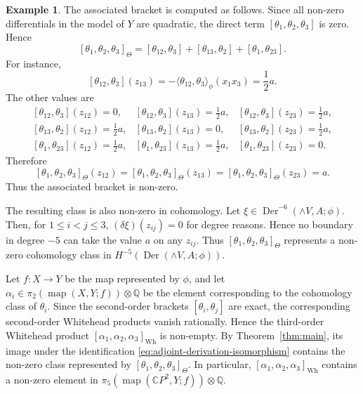 \documentclass[a4paper,10pt]{amsart}
\theoremstyle{definition}
\newtheorem{ex}[thm]{Example}
\theoremstyle{remark}
\newcommand{\map}{\operatorname{map}}
\newcommand{\Der}{\operatorname{Der}}
\numberwithin{equation}{section}
\begin{document}
\begin{ex}
The associated bracket is computed as follows. Since all non-zero differentials
in the model of $Y$ are quadratic, the direct term
$
[\theta_1,\theta_2,\theta_3]
$
is zero. Hence
\[
        [\theta_1,\theta_2,\theta_3]_\Theta
        =
        [\theta_{12},\theta_3]
        +
        [\theta_{13},\theta_2]
        +
        [\theta_1,\theta_{23}].
\]
For instance,
\[
[\theta_{12},\theta_3](z_{13})
=
-\langle\theta_{12},\theta_3\rangle_\phi(x_1x_3)
=
\frac{1}{2}a.
\]
The other values are
\[
\begin{array}{lll}
        [\theta_{12},\theta_3](z_{12})=0,&
        [\theta_{12},\theta_3](z_{13})=\frac{1}{2}a,&
        [\theta_{12},\theta_3](z_{23})=\frac{1}{2}a,\\[2mm]
        [\theta_{13},\theta_2](z_{12})=\frac{1}{2}a,&
        [\theta_{13},\theta_2](z_{13})=0,&
        [\theta_{13},\theta_2](z_{23})=\frac{1}{2}a,\\[2mm]
        [\theta_1,\theta_{23}](z_{12})=\frac{1}{2}a,&
        [\theta_1,\theta_{23}](z_{13})=\frac{1}{2}a,&
        [\theta_1,\theta_{23}](z_{23})=0.
\end{array}
\]
Therefore
\[
        [\theta_1,\theta_2,\theta_3]_\Theta(z_{12})
        =
        [\theta_1,\theta_2,\theta_3]_\Theta(z_{13})
        =
        [\theta_1,\theta_2,\theta_3]_\Theta(z_{23})
        =
        a.
\]
Thus the associated bracket is non-zero.

The resulting class is also non-zero in cohomology. Let
$
\xi\in \Der^{-6}(\wedge V,A;\phi).
$
Then, for $1\leq i<j\leq 3$, $(\delta\xi)(z_{ij}) = 0$ for degree reasons.
Hence no boundary in degree $-5$ can take the value $a$ on any $z_{ij}$. Thus
$
[\theta_1,\theta_2,\theta_3]_\Theta
$
represents a non-zero cohomology class in
$
H^{-5}(\Der(\wedge V,A;\phi)).
$

Let $f:X\to Y$ be the map represented by $\phi$, and let
$\alpha_i\in \pi_2(\map(X,Y;f))\otimes\mathbb{Q}$
be the element corresponding to the cohomology class of $\theta_i$.
Since the second-order brackets $[\theta_i,\theta_j]$ are exact, the corresponding second-order Whitehead products vanish rationally. 
Hence the third-order Whitehead product
$
        [\alpha_1,\alpha_2,\alpha_3]_{\mathrm{Wh}}
$
is non-empty. By Theorem~\ref{thm:main}, its image under the identification
\eqref{eq:adjoint-derivation-isomorphism} contains the non-zero class
represented by $[\theta_1,\theta_2,\theta_3]_\Theta$. In particular,
$[\alpha_1,\alpha_2,\alpha_3]_{\mathrm{Wh}}$ contains a non-zero element in
$
        \pi_5(\map(\mathbb{C}P^2,Y;f))\otimes\mathbb{Q}.
$
\end{ex}
\end{document}

